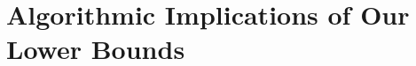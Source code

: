 \documentclass[11pt]{article}
\newcommand{\norm}[1]{\Vert #1 \Vert}
\begin{document}


\section{Algorithmic Implications of Our Lower Bounds}\label{sec:avoid-and-linear-attack}
\end{document}
